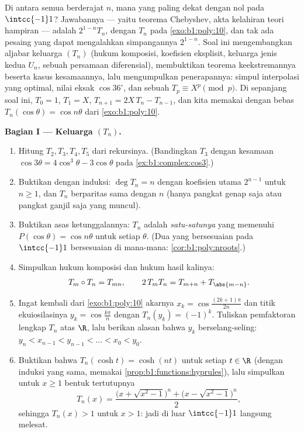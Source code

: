 \begin{problem}\label{pb:b1:poly:1}
Di antara semua  \emph{} berderajat $n$, mana yang paling
dekat dengan nol pada $\intcc{-1}1$? Jawabannya --- yaitu teorema
Chebyshev, akta kelahiran teori hampiran --- adalah
$2^{1-n}T_n$, dengan $T_n$  pada
\cref{exo:b1:poly:10}, dan tak ada pesaing  yang dapat mengalahkan
simpangannya $2^{1-n}$. Soal ini
mengembangkan aljabar keluarga $(T_n)$ (hukum komposisi,
koefisien eksplisit, keluarga jenis kedua $U_n$, sebuah
persamaan diferensial), membuktikan teorema keekstremannya beserta kasus
kesamaannya, lalu mengumpulkan penerapannya: simpul interpolasi yang optimal,
nilai eksak $\cos 36^\circ$, dan sebuah 
$T_p \equiv X^p \pmod p$. Di sepanjang soal ini, $T_0 = 1$, $T_1 = X$,
$T_{n+1} = 2X\,T_n - T_{n-1}$, dan kita memakai dengan bebas
$T_n(\cos\theta) = \cos n\theta$ dari \cref{exo:b1:poly:10}.

\medskip
\noindent\textbf{Bagian I --- Keluarga $(T_n)$.}
\begin{enumerate}
  \item Hitung $T_2, T_3, T_4, T_5$ dari rekursinya. (Bandingkan
        $T_3$ dengan kesamaan $\cos3\theta = 4\cos^3\theta -
        3\cos\theta$ pada \cref{ex:b1:complex:cos3}.)
  \item Buktikan dengan induksi: $\deg T_n = n$ dengan koefisien
        utama $2^{n-1}$ untuk $n \geq 1$, dan $T_n$ berparitas
        sama dengan $n$ (hanya pangkat genap saja atau pangkat ganjil saja yang muncul).
  \item Buktikan asas ketunggalannya: $T_n$ adalah \emph{satu-satunya}
         yang memenuhi $P(\cos\theta) = \cos n\theta$ untuk
        setiap $\theta$. (Dua  yang bersesuaian pada $\intcc{-1}1$
        bersesuaian di mana-mana: \cref{cor:b1:poly:nroots}.)
  \item Simpulkan hukum komposisi dan hukum hasil kalinya:
        \[
        T_m \circ T_n = T_{mn},
        \qquad
        2\,T_m T_n = T_{m+n} + T_{\abs{m-n}} .
        \]
  \item Ingat kembali dari \cref{exo:b1:poly:10} akarnya $x_k =
        \cos\frac{(2k+1)\pi}{2n}$ dan titik ekuiosilasinya
        $y_k = \cos\frac{k\pi}n$ dengan $T_n(y_k) = (-1)^k$. Tuliskan
        pemfaktoran lengkap $T_n$ atas $\R$, lalu
        berikan alasan bahwa $y_k$ berselang-seling: $y_n < x_{n-1} < y_{n-1}
        < \dots < x_0 < y_0$.
  \item Buktikan bahwa $T_n(\cosh t) = \cosh(nt)$ untuk setiap $t \in \R$
        (dengan induksi yang sama, memakai
        \cref{prop:b1:functions:hyprules}), lalu simpulkan untuk $x
        \geq 1$ bentuk tertutupnya
        \[
        T_n(x) = \frac{\bigl(x + \sqrt{x^2 - 1}\bigr)^n +
        \bigl(x - \sqrt{x^2 - 1}\bigr)^n}{2} ,
        \]
        sehingga $T_n(x) > 1$ untuk $x > 1$: jadi di luar $\intcc{-1}1$
         langsung melesat.
\end{enumerate}


\end{problem}

